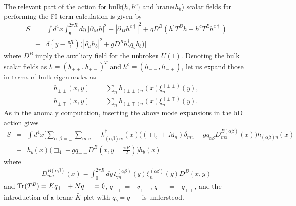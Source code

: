 \documentclass[a4paper,12pt]{article}
\begin{document}
The relevant part of the action for bulk($h,h^c$)
and brane($h_b$) scalar fields
for performing the FI term calculation is given by
\begin{eqnarray}
S&=&\int d^4 x\int^{2\pi R}_0 dy
\bigg[|\partial_M h|^2+|\partial_M h^{c\dagger}|^2
+g D^B(h^\dagger T^B h-h^c T^B h^{c\dagger}) \nonumber \\
&+&\delta(y-\frac{\pi R}{2})\bigg(|\partial_\mu h_b|^2
+gD^B h^\dagger_b q_b h_b\bigg)\bigg]
\end{eqnarray}
where $D^B$ imply the auxiliary field for the unbroken $U(1)$.
Denoting the bulk scalar fields as $h=(h_{++},h_{+-})^T$ and
$h^c=(h_{--},h_{-+})$, let us expand those in terms of bulk eigenmodes as
\begin{eqnarray}
h_{\pm\pm}(x,y)&=&\sum_n h_{(\pm\pm) n}(x)\xi^{(\pm\pm)}_n(y),\\
h_{\pm\mp}(x,y)&=&\sum_n h_{(\pm\mp) n}(x)\xi^{(\pm\mp)}_n(y).
\end{eqnarray}
As in the anomaly computation, inserting the above mode expansions 
in the 5D action gives
\begin{eqnarray}
S&=&\int d^4x\bigg[\sum_{\alpha,\beta=\pm}\sum_{m,n}
-h^\dagger_{(\alpha\beta) m}(x)
\bigg((\Box_4+M_n)\delta_{mn}
-gq_{\alpha\beta}D^{B(\alpha\beta)}_{mn}(x)\bigg) h_{(\alpha\beta) n}(x)
\nonumber \\
&-&h^\dagger_b(x)\bigg(\Box_4-gq_{--}
D^B(x,y=\frac{\pi R}{2})\bigg)h_b(x)\bigg]
\end{eqnarray}
where
\begin{eqnarray}
D^{B(\alpha\beta)}_{mn}(x)=\int^{2\pi R}_0 dy\,
\xi^{(\alpha\beta)}_m(y)\xi^{(\alpha\beta)}_n(y)D^B(x,y)
\end{eqnarray}
and
${\rm Tr}(T^B)=Kq_{++}+Nq_{+-}=0$, $q_{-+}=-q_{+-}$, $q_{--}=-q_{++}$,
and the introduction of a brane $\bar K$-plet with $q_b=q_{--}$ is understood.
\end{document}
